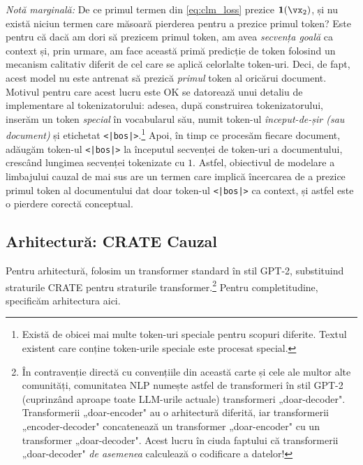 \documentclass[../../book-main_ro.tex]{subfiles}
\begin{document}
\textit{Notă marginală:} De ce primul termen din \eqref{eq:clm_loss} prezice \(\vone(\vx_{2})\), și nu există niciun termen care măsoară pierderea pentru a prezice primul token? Este pentru că dacă am dori să prezicem primul token, am avea \textit{secvența goală} ca context și, prin urmare, am face această primă predicție de token folosind un mecanism calitativ diferit de cel care se aplică celorlalte token-uri. Deci, de fapt, acest model nu este antrenat să prezică \textit{primul} token al oricărui document. Motivul pentru care acest lucru este OK se datorează unui detaliu de implementare al tokenizatorului: adesea, după construirea tokenizatorului, inserăm un token \textit{special} în vocabularul său, numit token-ul \textit{început-de-șir (sau document)} și etichetat \texttt{<|bos|>}.\footnote{Există de obicei mai multe token-uri speciale pentru scopuri diferite. Textul existent care conține token-urile speciale este procesat special.} Apoi, în timp ce procesăm fiecare document, adăugăm token-ul \texttt{<|bos|>} la începutul secvenței de token-uri a documentului, crescând lungimea secvenței tokenizate cu \(1\). Astfel, obiectivul de modelare a limbajului cauzal de mai sus are un termen care implică încercarea de a prezice primul token al documentului dat doar token-ul \texttt{<|bos|>} ca context, și astfel este o pierdere corectă conceptual.

\subsection{Arhitectură: CRATE Cauzal}

Pentru arhitectură, folosim un transformer standard în stil GPT-2, substituind straturile CRATE pentru straturile transformer.\footnote{În contravenție directă cu convențiile din această carte și cele ale multor alte comunități, comunitatea NLP numește astfel de transformeri în stil GPT-2 (cuprinzând aproape toate LLM-urile actuale) transformeri „doar-decoder". Transformerii „doar-encoder" au o arhitectură diferită, iar transformerii „encoder-decoder" concatenează un transformer „doar-encoder" cu un transformer „doar-decoder". Acest lucru în ciuda faptului că transformerii „doar-decoder" \textit{de asemenea} calculează o codificare a datelor!} Pentru completitudine, specificăm arhitectura aici.
\end{document}
